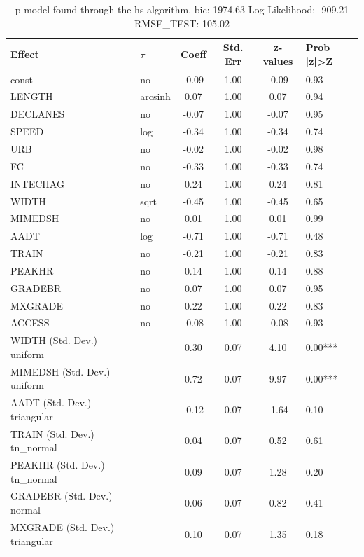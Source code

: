 \begin{table}
	\caption{p model found through the hs algorithm. bic: 1974.63 Log-Likelihood: -909.21 RMSE_TEST: 105.02}
	\begin{center}
		\begin{tabular}{|l|l|c|c|c|l|}
			\hline
			Effect & $\tau$ & Coeff & Std. Err & z-values & Prob |z|>Z \\
			\hline
			const & no & -0.09 & 1.00 & -0.09 & 0.93 \\
			\hline
			LENGTH & arcsinh & 0.07 & 1.00 & 0.07 & 0.94 \\
			\hline
			DECLANES & no & -0.07 & 1.00 & -0.07 & 0.95 \\
			\hline
			SPEED & log & -0.34 & 1.00 & -0.34 & 0.74 \\
			\hline
			URB & no & -0.02 & 1.00 & -0.02 & 0.98 \\
			\hline
			FC & no & -0.33 & 1.00 & -0.33 & 0.74 \\
			\hline
			INTECHAG & no & 0.24 & 1.00 & 0.24 & 0.81 \\
			\hline
			WIDTH & sqrt & -0.45 & 1.00 & -0.45 & 0.65 \\
			\hline
			MIMEDSH & no & 0.01 & 1.00 & 0.01 & 0.99 \\
			\hline
			AADT & log & -0.71 & 1.00 & -0.71 & 0.48 \\
			\hline
			TRAIN & no & -0.21 & 1.00 & -0.21 & 0.83 \\
			\hline
			PEAKHR & no & 0.14 & 1.00 & 0.14 & 0.88 \\
			\hline
			GRADEBR & no & 0.07 & 1.00 & 0.07 & 0.95 \\
			\hline
			MXGRADE & no & 0.22 & 1.00 & 0.22 & 0.83 \\
			\hline
			ACCESS & no & -0.08 & 1.00 & -0.08 & 0.93 \\
			\hline
			WIDTH (Std. Dev.) uniform &  & 0.30 & 0.07 & 4.10 & 0.00*** \\
			\hline
			MIMEDSH (Std. Dev.) uniform &  & 0.72 & 0.07 & 9.97 & 0.00*** \\
			\hline
			AADT (Std. Dev.) triangular &  & -0.12 & 0.07 & -1.64 & 0.10 \\
			\hline
			TRAIN (Std. Dev.) tn_normal &  & 0.04 & 0.07 & 0.52 & 0.61 \\
			\hline
			PEAKHR (Std. Dev.) tn_normal &  & 0.09 & 0.07 & 1.28 & 0.20 \\
			\hline
			GRADEBR (Std. Dev.) normal &  & 0.06 & 0.07 & 0.82 & 0.41 \\
			\hline
			MXGRADE (Std. Dev.) triangular &  & 0.10 & 0.07 & 1.35 & 0.18 \\

\end{tabular}
\end{center}
\end{table}
